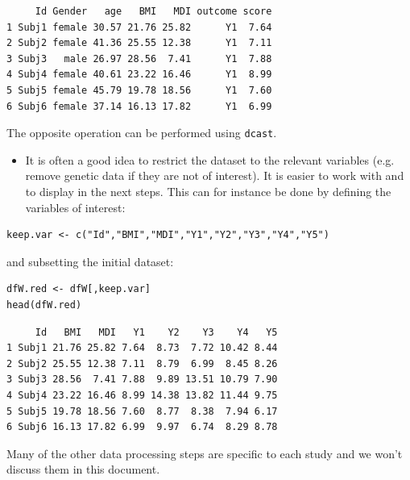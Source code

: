 \documentclass{article}
\begin{document}
\begin{verbatim}
     Id Gender   age   BMI   MDI outcome score
1 Subj1 female 30.57 21.76 25.82      Y1  7.64
2 Subj2 female 41.36 25.55 12.38      Y1  7.11
3 Subj3   male 26.97 28.56  7.41      Y1  7.88
4 Subj4 female 40.61 23.22 16.46      Y1  8.99
5 Subj5 female 45.79 19.78 18.56      Y1  7.60
6 Subj6 female 37.14 16.13 17.82      Y1  6.99
\end{verbatim}

The opposite operation can be performed using \texttt{dcast}.

\begin{itemize}
\item It is often a good idea to restrict the dataset to the relevant
variables (e.g. remove genetic data if they are not of interest). It
is easier to work with and to display in the next steps. This can
for instance be done by defining the variables of interest:
\end{itemize}
\lstset{language=r,label= ,caption= ,captionpos=b,numbers=none}
\begin{lstlisting}
keep.var <- c("Id","BMI","MDI","Y1","Y2","Y3","Y4","Y5")
\end{lstlisting}

and subsetting the initial dataset:
\lstset{language=r,label= ,caption= ,captionpos=b,numbers=none}
\begin{lstlisting}
dfW.red <- dfW[,keep.var]
head(dfW.red)
\end{lstlisting}

\begin{verbatim}
     Id   BMI   MDI   Y1    Y2    Y3    Y4   Y5
1 Subj1 21.76 25.82 7.64  8.73  7.72 10.42 8.44
2 Subj2 25.55 12.38 7.11  8.79  6.99  8.45 8.26
3 Subj3 28.56  7.41 7.88  9.89 13.51 10.79 7.90
4 Subj4 23.22 16.46 8.99 14.38 13.82 11.44 9.75
5 Subj5 19.78 18.56 7.60  8.77  8.38  7.94 6.17
6 Subj6 16.13 17.82 6.99  9.97  6.74  8.29 8.78
\end{verbatim}

Many of the other data processing steps are specific to each study and
we won't discuss them in this document. 

\clearpage
\end{document}
